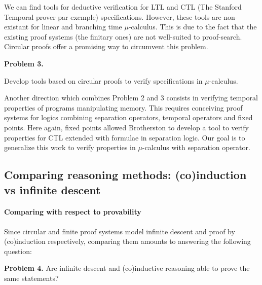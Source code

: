 \documentclass[11pt,twocolumn]{article}
\begin{document}
We can find tools for deductive verification for LTL and CTL (The Stanford Temporal prover par exemple) specifications. However, these tools are non-existant for linear and branching time $\mu$-calculus. This is due to the fact that the existing proof systems (the finitary ones) are not well-suited to proof-search. Circular proofs offer a promising way to circumvent this problem. 


\begin{center}
\begin{bclogo}[logo= ,arrondi = 0.1, couleur = green!10,  epBarre = 0]{}
  \vspace{-10pt}
  \textbf{Problem 3.}
  
  Develop tools based on circular proofs to verify specifications in $\mu$-calculus.
\end{bclogo}
\end{center}
Another direction which combines Problem 2 and 3 consists in verifying temporal properties of programs manipulating memory. This requires conceiving proof systems for logics combining separation operators, temporal operators and fixed points. Here again, fixed points allowed Brotherston to develop a tool  \cite{TellezB17} to verify properties for CTL extended with formulae in separation logic. Our goal is to generalize this work to verify properties in $\mu$-calculus with separation operator.

\subsection{Comparing reasoning methods: (co)induction vs infinite descent}

\label{ComparaisonParkCirc}

\paragraph{Comparing with respect to provability}

Since circular and finite proof systems model infinite descent and proof by (co)induction respectively, comparing them amounts to answering the following question:
\begin{center}
\begin{bclogo}[logo= ,arrondi = 0.1, couleur = green!10,  epBarre = 0]{}
  \vspace{-10pt}
  \textbf{Problem 4.}
Are infinite descent and (co)inductive reasoning able to prove the same statements?

\end{bclogo}
\end{center}
\end{document}
